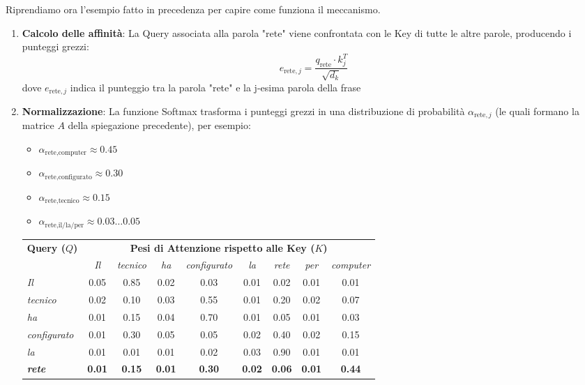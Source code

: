 \documentclass{article}
\begin{document}
Riprendiamo ora l'esempio fatto in precedenza per capire come funziona il meccanismo.
\begin{enumerate}
    \item \textbf{Calcolo delle affinità}: La Query associata alla parola "rete" viene confrontata con le Key di tutte le altre parole, producendo i punteggi grezzi: $$e_{\text{rete}, j} = \frac{q_{\text{rete}} \cdot k_j^T}{\sqrt{d_k}}$$ dove $e_{\text{rete}, j}$ indica il punteggio tra la parola "rete" e la j-esima parola della frase 
    \item \textbf{Normalizzazione}: La funzione Softmax trasforma i punteggi grezzi in una distribuzione di probabilità $\alpha_{\text{rete}, j}$ (le quali formano la matrice $A$ della spiegazione precedente), per esempio: 
    \begin{itemize}
        \item $\alpha_{\text{rete}, \text{computer}} \approx 0.45$
        \item $\alpha_{\text{rete}, \text{configurato}} \approx 0.30$
        \item $\alpha_{\text{rete}, \text{tecnico}} \approx 0.15$
        \item $\alpha_{\text{rete}, \text{il/la/per}} \approx 0.03 \dots 0.05$
    \end{itemize} 
    \begin{table}[ht]
    \centering
    \small
    \begin{tabular}{lcccccccc}
    \toprule
    \textbf{Query ($Q$)} & \multicolumn{8}{c}{\textbf{Pesi di Attenzione rispetto alle Key ($K$)}} \\
    \cmidrule(lr){2-9}
    & \textit{Il} & \textit{tecnico} & \textit{ha} & \textit{configurato} & \textit{la} & \textit{rete} & \textit{per} & \textit{computer} \\
    \midrule
    \textit{Il}          & 0.05 & 0.85 & 0.02 & 0.03 & 0.01 & 0.02 & 0.01 & 0.01 \\
    \textit{tecnico}     & 0.02 & 0.10 & 0.03 & 0.55 & 0.01 & 0.20 & 0.02 & 0.07 \\
    \textit{ha}          & 0.01 & 0.15 & 0.04 & 0.70 & 0.01 & 0.05 & 0.01 & 0.03 \\
    \textit{configurato} & 0.01 & 0.30 & 0.05 & 0.05 & 0.02 & 0.40 & 0.02 & 0.15 \\
    \textit{la}          & 0.01 & 0.01 & 0.01 & 0.02 & 0.03 & 0.90 & 0.01 & 0.01 \\
    \rowcolor{gray!15} 
    \textbf{\textit{rete}} & \textbf{0.01} & \textbf{0.15} & \textbf{0.01} & \textbf{0.30} & \textbf{0.02} & \textbf{0.06} & \textbf{0.01} & \textbf{0.44} \\

\end{tabular}
\end{table}
\end{enumerate}
\end{document}
